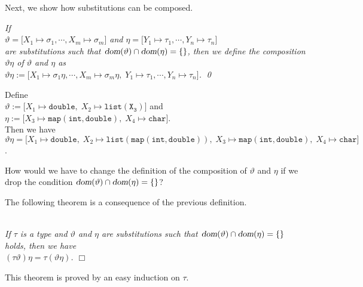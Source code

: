 \noindent
Next, we show how substitutions can be composed.
\begin{Definition} 
{\em
    If \\[0.2cm]
    \hspace*{1.3cm}  
    $\vartheta = \big[ X_1 \mapsto \sigma_1, \cdots, X_m \mapsto \sigma_m \big]$ \quad and \quad
    $\eta = \big[ Y_1 \mapsto \tau_1, \cdots, Y_n \mapsto \tau_n \big]$ 
    \\[0.2cm]
    are substitutions such that $\textsl{dom}(\vartheta) \cap \textsl{dom}(\eta) = \{\}$,
    then we define the \emph{composition} $\vartheta\eta$ of $\vartheta$ and $\eta$ as \\[0.2cm]
    \hspace*{1.3cm} $\vartheta\eta := 
    \big[ X_1 \mapsto \sigma_1\eta, \cdots, X_m \mapsto \sigma_m\eta,\; 
          Y_1 \mapsto \tau_1, \cdots, Y_n \mapsto \tau_n \big]$.
    \qed
}
\end{Definition}

\exampleEng
Define \\[0.2cm]
\hspace*{1.3cm} 
$\vartheta := \big[ X_1 \mapsto \mathtt{double},\; X_2 \mapsto \mathtt{list(X_3)} \big]$
\quad and 
\\[0.2cm]
\hspace*{1.3cm}
$\eta := \big[ X_3 \mapsto \texttt{map}(\mathtt{int},\mathtt{double}),\; X_4 \mapsto \mathtt{char} \big]$. 
\\[0.2cm]
Then we have \\[0.2cm]
\hspace*{1.3cm} 
$\vartheta\eta = \big[ X_1 \mapsto \mathtt{double},\; 
                       X_2 \mapsto \mathtt{list}(\mathtt{map(int, double)}),\;
 X_3 \mapsto \mathtt{map(int, double)},\; X_4 \mapsto \mathtt{char} \big]
$.
\eox
\vspace{0.3cm}

\exerciseEng
How would we have to change the definition of the composition of $\vartheta$ and
$\eta$ if we drop the condition $\textsl{dom}(\vartheta) \cap \textsl{dom}(\eta) = \{\}$?
\vspace{0.3cm}

The following theorem is a consequence of the previous definition.
\begin{Theorem}\label{satz:komposition}  \hspace*{\fill} \\
{\em
    If $\tau$ is a type and $\vartheta$ and $\eta$ are substitutions such that 
    $\textsl{dom}(\vartheta) \cap \textsl{dom}(\eta) = \{\}$ holds, then we have \\[0.2cm]
    \hspace*{1.3cm} $(\tau \vartheta)\eta = \tau (\vartheta\eta)$.
    \hspace*{\fill} $\Box$
}
\end{Theorem}
This theorem is proved by an easy induction on $\tau$.
\vspace{0.3cm}

